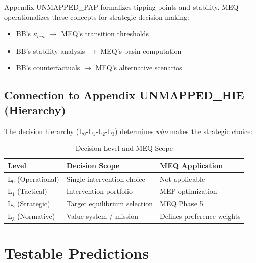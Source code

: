 Appendix UNMAPPED_PAP formalizes tipping points and stability. MEQ operationalizes these
concepts for strategic decision-making:

\begin{itemize}[nosep]
    \item BB's $\kappa_{crit}$ $\to$ MEQ's transition thresholds
    \item BB's stability analysis $\to$ MEQ's basin computation
    \item BB's counterfactuals $\to$ MEQ's alternative scenarios
\end{itemize}

\subsection{Connection to Appendix UNMAPPED_HIE (Hierarchy)}

The decision hierarchy (L$_0$-L$_1$-L$_2$-L$_3$) determines \textit{who} makes
the strategic choice:

\begin{table}[H]
\centering
\caption{Decision Level and MEQ Scope}
\label{tab:meq-hierarchy}
\renewcommand{\arraystretch}{1.3}
\begin{tabular}{@{}lll@{}}
\toprule
\textbf{Level} & \textbf{Decision Scope} & \textbf{MEQ Application} \\
\midrule
L$_0$ (Operational) & Single intervention choice & Not applicable \\
L$_1$ (Tactical) & Intervention portfolio & MEP optimization \\
L$_2$ (Strategic) & Target equilibrium selection & MEQ Phase 5 \\
L$_3$ (Normative) & Value system / mission & Defines preference weights \\
\bottomrule
\end{tabular}
\end{table}

\section{Testable Predictions}
\label{sec:meq-predictions}

